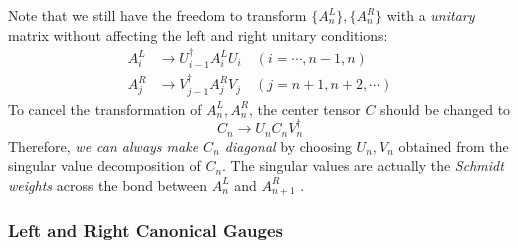 \documentclass[11pt]{article}
\begin{document}
\endgroup
Note that we still have the freedom to transform $\{A^L_n\}, \{A^R_n\}$ with a \emph{unitary} matrix without affecting the left and right unitary conditions:
\begin{align}
    A^L_i &\to U^\dagger_{i-1} A^L_i U_i
    \quad (i = \cdots, n-1, n) 
    \\
    A^R_j &\to V^\dagger_{j-1} A^R_j V_j
    \quad (j = n+1, n+2, \cdots)
\end{align}
To cancel the transformation of $A^L_n, A^R_n$, the center tensor $C$ should be changed to
\begin{equation}
    C_n \to U_n C_n V^\dagger_n
\end{equation}
Therefore, \emph{we can always make $C_n$ diagonal} by choosing $U_n, V_n$ obtained from the singular value decomposition of $C_n$. The singular values are actually the \emph{Schmidt weights} across the bond between $A^L_n$ and $A^R_{n+1}$ \cite{Mortier2024}. 

\subsubsection{Left and Right Canonical Gauges}
\end{document}

